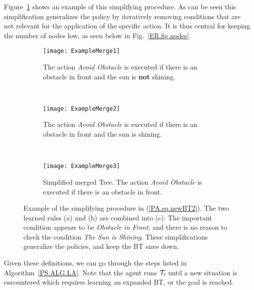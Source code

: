 Figure~\ref{PA.fig.merge} shows an example of this simplifying procedure. As can be seen this simplification generalizes the policy by iteratively removing conditions that are not relevant for the application of the specific action. It is thus central for keeping the number of nodes low, as seen below in Fig.~\ref{ER.fig.nodes}.
\begin{figure}[h]
        \centering
        \begin{subfigure}[b]{0.3\columnwidth}
                \centering
                \texttt{[image: ExampleMerge1]}
                \caption{The action \emph{Avoid Obstacle} is executed if there is an obstacle in front and the sun is {\bf not} shining. }
        \end{subfigure}%
       ~ %
        \begin{subfigure}[b]{0.3\columnwidth}
                \centering
                \texttt{[image: ExampleMerge2]}
                \caption{The action \emph{Avoid Obstacle} is executed if there is an obstacle in front and the sun is shining. \;\;\;\;}
        \end{subfigure}
        ~ %
        \begin{subfigure}[b]{0.3\columnwidth}
                \centering
                \texttt{[image: ExampleMerge3]}
                \caption{Simplified merged Tree. The action \emph{Avoid Obstacle} is executed if there is an obstacle in front. \;\; \;\;\;\;\;\;\;\;}
        \end{subfigure}
        \caption{Example of the simplifying procedure in (\ref{PA.eq.newBT2}). The two learned rules (a) and (b) are combined into (c): The important condition appears to be  \emph{Obstacle in Front}, and there is no reason to check the condition \emph{The Sun is Shining}. These simplifications generalize the policies, and keep the BT sizes down.  }
                        \label{PA.fig.merge}

\end{figure}


Given these definitions, we can go through the steps listed in Algorithm~\ref{PS.ALG.LA}.
Note that the agent runs $\mathcal{T}_i$ until a new situation is encountered
which requires learning an expanded BT, or the goal is reached.

